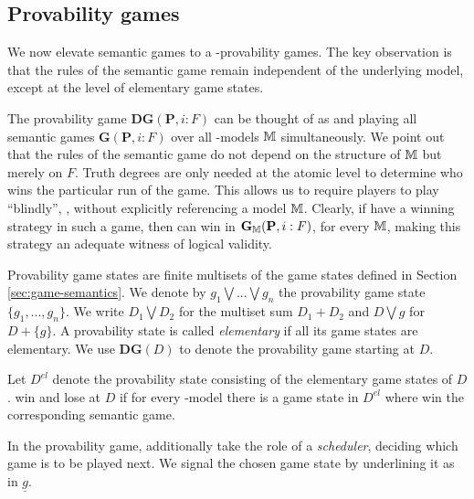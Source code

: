 \subsection{Provability games}
We now elevate semantic games to a \PNL-provability games. The key observation is that the rules of the semantic game remain independent of the underlying model, except at the level of elementary game states.

The provability game
$\mathbf{DG}(\mathbf{P},i:F )$ can be thought of as \Me and \You playing all
semantic games $\mathbf{G}(\mathbf{P},i:F )$ over all \PNL-models $\mathbb{M}$
simultaneously. We point out that  the rules of the semantic game do not depend on the structure
of $\mathbb{M}$ but merely on $F $. Truth degrees are only needed at the atomic level
to determine who wins the particular run of the game. This allows us to require
players to play ``blindly'', \ie, without explicitly referencing  a model $\mathbb{M}$.
Clearly, if \Ic have a winning strategy in such a game, then \Ic can win in
$\mathbf{G}_{\mathbb{M}}(\mathbf{P},i:F )$, for every $\mathbb{M}$, making this strategy an
adequate witness of logical validity. 

Provability game states are finite multisets of the game states
defined in Section \ref{sec:game-semantics}. We denote by $g_1 \bigvee ... \bigvee g_n$ 
 the provability game state $\{g_1,...,g_n\}$.
We write $D_1 \bigvee D_2$ for the
multiset sum $D_1+D_2$ and $D\bigvee g$ for $D+\{g\}$. A provability state is
called \emph{elementary} if all its game states are elementary.
We use $\mathbf{DG}(D)$ to denote the provability game starting at $D$. 

\begin{definition}\label{def:win}
Let $D^{el}$ denote the provability state consisting of the elementary game
states of $D$. \Ic win and \You lose at $D$ if for every \PNL-model there is
a game state in $D^{el}$ where \Ic win the corresponding semantic game. 
\end{definition}

In the provability game, \Ic additionally take the
role of a \emph{scheduler}, deciding which game  is to be played next. We
signal the chosen game state by underlining it as in $\underline{g}$.



